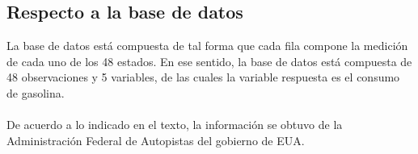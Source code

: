 \documentclass[%
reprint,
 amsmath,amssymb,
 aps,
]{revtex4-1}
\begin{document}
\subsection{\label{sec:level2}Respecto a la base de datos}
La base de datos est\'a compuesta de tal forma que cada fila compone la medici\'on de cada uno de los 48 estados. En ese sentido, la base de datos est\'a compuesta de 48 observaciones y 5 variables, de las cuales la variable respuesta es el consumo de gasolina.\\
\\
 De acuerdo a lo indicado en el texto, la informaci\'on se obtuvo de la Administraci\'on Federal de Autopistas del gobierno de EUA.
\end{document}
